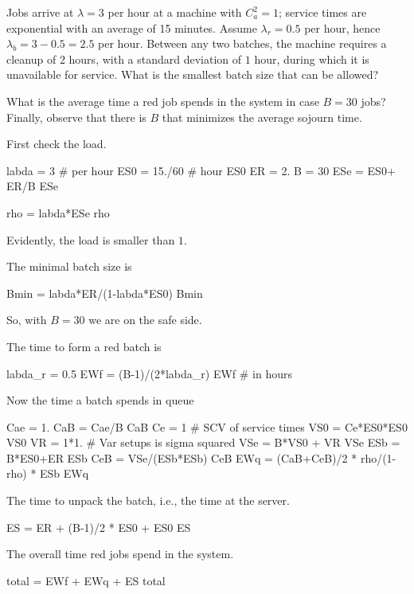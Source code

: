 \begin{exercise}
 Jobs arrive at $\lambda=3$ per hour at a machine with $C_a^2=1$; service times are exponential with an average of 15 minutes. Assume $\lambda_r = 0.5$ per hour, hence $\lambda_b = 3-0.5=2.5$ per hour. Between any two batches, the machine requires a cleanup of 2 hours, with a standard deviation of $1$ hour, during which it is unavailable for service.
 What is the smallest batch size that can be allowed?

 What is the average time a red job spends in the system in case $B=30$ jobs?
 Finally, observe that there is $B$ that minimizes the average sojourn time.
\begin{solution}
First check the load.
\begin{pyconsole}
labda = 3 # per hour
ES0 = 15./60 # hour
ES0
ER = 2.
B = 30
ESe = ES0+ ER/B
ESe

rho = labda*ESe
rho
\end{pyconsole}
Evidently, the load is smaller than $1$. 

The minimal batch size is
\begin{pyconsole}
Bmin = labda*ER/(1-labda*ES0)
Bmin
\end{pyconsole}
So, with $B=30$ we are on the safe side. 

The time to form a red batch is 
\begin{pyconsole}
labda_r = 0.5
EWf = (B-1)/(2*labda_r)
EWf # in hours
\end{pyconsole}

Now the time a batch spends in queue
\begin{pyconsole}
Cae = 1.
CaB = Cae/B
CaB
Ce = 1 # SCV of service times
VS0 = Ce*ES0*ES0
VS0
VR = 1*1. # Var setups is sigma squared
VSe = B*VS0 + VR
VSe
ESb = B*ES0+ER
ESb
CeB = VSe/(ESb*ESb)
CeB
EWq = (CaB+CeB)/2 * rho/(1-rho) * ESb
EWq
\end{pyconsole}

The time to unpack the batch, i.e., the time at the server. 
\begin{pyconsole}
ES = ER + (B-1)/2 * ES0 + ES0 
ES
\end{pyconsole}


The overall time red jobs spend in the system.
\begin{pyconsole}
total = EWf + EWq + ES
total
\end{pyconsole}

\end{solution}
\end{exercise}





